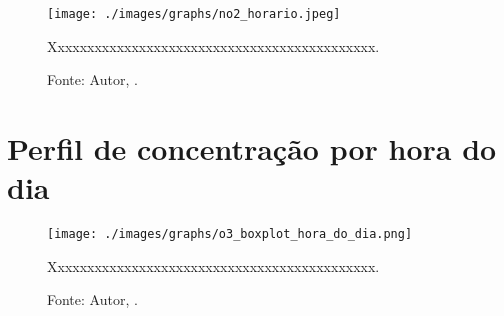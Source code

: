 


\lipsum[100]




\begin{figure}[H]
    \centering
    \texttt{[image: ./images/graphs/no2\_horario.jpeg]}
    \caption{Xxxxxxxxxxxxxxxxxxxxxxxxxxxxxxxxxxxxxxxxxxxx.}
    \label{fig:no2_horario.jpeg}
    \caption*{Fonte: Autor, \imprimirdata.}
\end{figure}



\lipsum[100]


\section{Perfil de concentração por hora do dia}







\begin{figure}[H]
    \centering
    \texttt{[image: ./images/graphs/o3\_boxplot\_hora\_do\_dia.png]}
    \caption{Xxxxxxxxxxxxxxxxxxxxxxxxxxxxxxxxxxxxxxxxxxxx.}
    \label{fig:o3_boxplot_hora_do_dia.png}
    \caption*{Fonte: Autor, \imprimirdata.}
\end{figure}



